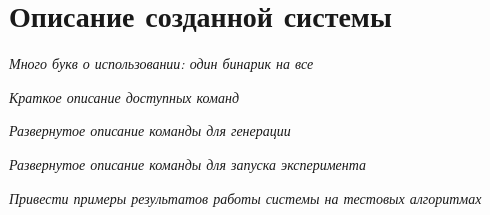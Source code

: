\chapter{Описание созданной системы}

\textit{Много букв о использовании: один бинарик на все}

\textit{Краткое описание доступных команд}

\textit{Развернутое описание команды для генерации}

\textit{Развернутое описание команды для запуска эксперимента}

\textit{Привести примеры результатов работы системы на тестовых алгоритмах}